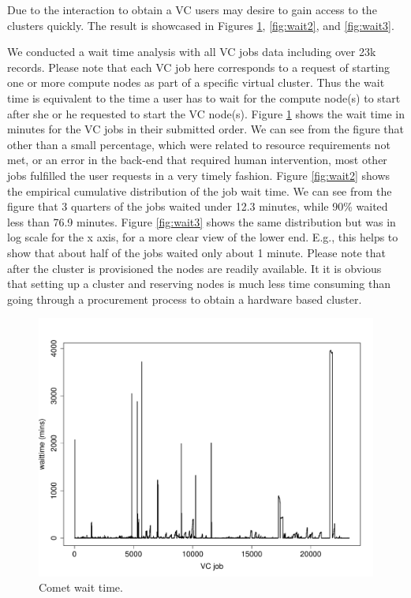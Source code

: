 \documentclass[sigconf,hyphens]{acmart}
\begin{document}
Due to the interaction to obtain a VC users may desire to gain access
to the clusters quickly. The result is showcased in Figures
\ref{fig:wait1}, \ref{fig:wait2}, and \ref{fig:wait3}.


We conducted a wait time analysis with all VC jobs data including over
23k records. Please note that each VC job here corresponds to a
request of starting one or more compute nodes as part of a specific
virtual cluster. Thus the wait time is equivalent to the time a user
has to wait for the compute node(s) to start after she or he requested
to start the VC node(s). Figure \ref{fig:wait1} shows the wait time in
minutes for the VC jobs in their submitted order. We can see from the
figure that other than a small percentage, which were related to
resource requirements not met, or an error in the back-end that
required human intervention, most other jobs fulfilled the user
requests in a very timely fashion. Figure \ref{fig:wait2} shows the
empirical cumulative distribution of the job wait time. We can see
from the figure that 3 quarters of the jobs waited under 12.3 minutes,
while 90\% waited less than 76.9 minutes. Figure \ref{fig:wait3} shows
the same distribution but was in log scale for the x axis, for a more
clear view of the lower end. E.g., this helps to show that about half
of the jobs waited only about 1 minute. Please note that after the
cluster is provisioned the nodes are readily available. It it is
obvious that setting up a cluster and reserving nodes is much less
time consuming than going through a procurement process to obtain a
hardware based cluster.

\begin{figure}[h]
  \centering
  \includegraphics[width=\linewidth]{images/vc_waittime_sum1.pdf}
  \caption{Comet wait time.}\label{fig:wait1}

\end{figure}
\end{document}
